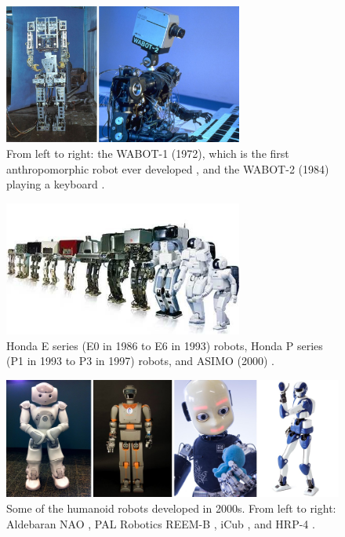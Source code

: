 \begin{figure}
    \centering
    \includegraphics[width=0.7\textwidth]{figures/01-introduction/WABOTs.jpg}
    \caption{From left to right: the WABOT-1 (1972), which is the first anthropomorphic robot
        ever developed \cite{Kato1973TheWABOT1}, and the WABOT-2 (1984)
        playing a keyboard \cite{Kato1987WABOT2}.}
    \label{fig:introduction:WABOTs}
\end{figure}

\begin{figure}
    \centering
    \includegraphics[width=0.7\textwidth]{figures/01-introduction/The-ASIMO-humanoid-robot-history.png}
    \caption{Honda E series (E0 in 1986 to E6 in 1993) robots, Honda P series (P1 in
        1993 to P3 in 1997) robots, and ASIMO (2000)
        \cite{Shigemi2019ASIMOandHumanoidRobotResearchatHonda}.}
    \label{fig:introduction:ASIMO-humanoid-history}
\end{figure}

\begin{figure}
    \centering
    \includegraphics[width=\textwidth]{figures/01-introduction/robots-in-2000.jpg}
    \caption{Some of the humanoid robots developed in 2000s. From left to right:
        Aldebaran NAO \cite{Gouaillier2008NAOHumanoid},
        PAL Robotics REEM-B \cite{Tellez2008REEMB},
        iCub \cite{Metta2010iCubHumanoid}, and
        HRP-4 \cite{Kaneko2011HRP4}.
    }
    \label{fig:introduction:robots-in-2000}
\end{figure}

